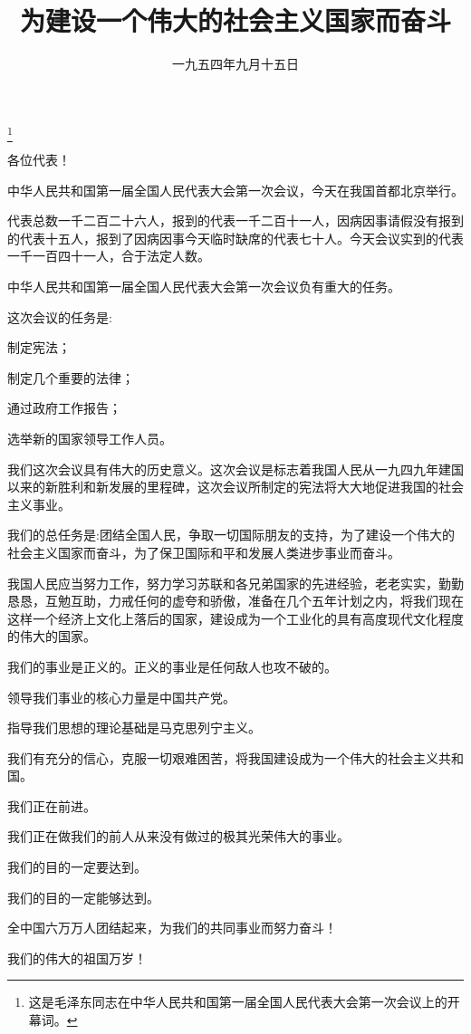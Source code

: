 
\title{为建设一个伟大的社会主义国家而奋斗}
\date{一九五四年九月十五日}
\thanks{这是毛泽东同志在中华人民共和国第一届全国人民代表大会第一次会议上的开幕词。}
\maketitle


各位代表！

中华人民共和国第一届全国人民代表大会第一次会议，今天在我国首都北京举行。

代表总数一千二百二十六人，报到的代表一千二百十一人，因病因事请假没有报到的代表十五人，报到了因病因事今天临时缺席的代表七十人。今天会议实到的代表一千一百四十一人，合于法定人数。

中华人民共和国第一届全国人民代表大会第一次会议负有重大的任务。

这次会议的任务是:

制定宪法；

制定几个重要的法律；

通过政府工作报告；

选举新的国家领导工作人员。

我们这次会议具有伟大的历史意义。这次会议是标志着我国人民从一九四九年建国以来的新胜利和新发展的里程碑，这次会议所制定的宪法将大大地促进我国的社会主义事业。

我们的总任务是:团结全国人民，争取一切国际朋友的支持，为了建设一个伟大的社会主义国家而奋斗，为了保卫国际和平和发展人类进步事业而奋斗。

我国人民应当努力工作，努力学习苏联和各兄弟国家的先进经验，老老实实，勤勤恳恳，互勉互助，力戒任何的虚夸和骄傲，准备在几个五年计划之内，将我们现在这样一个经济上文化上落后的国家，建设成为一个工业化的具有高度现代文化程度的伟大的国家。

我们的事业是正义的。正义的事业是任何敌人也攻不破的。

领导我们事业的核心力量是中国共产党。

指导我们思想的理论基础是马克思列宁主义。

我们有充分的信心，克服一切艰难困苦，将我国建设成为一个伟大的社会主义共和国。

我们正在前进。

我们正在做我们的前人从来没有做过的极其光荣伟大的事业。

我们的目的一定要达到。

我们的目的一定能够达到。

全中国六万万人团结起来，为我们的共同事业而努力奋斗！

我们的伟大的祖国万岁！

